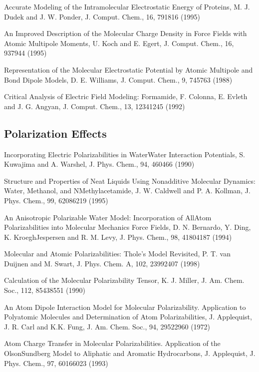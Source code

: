 \documentclass[letterpaper,11pt,english]{sphinxmanual}
\begin{document}
Accurate Modeling of the Intramolecular Electrostatic Energy of Proteins, M. J. Dudek and J. W. Ponder, J. Comput. Chem., 16, 791\sphinxhyphen{}816 (1995)

An Improved Description of the Molecular Charge Density in Force Fields with Atomic Multipole Moments, U. Koch and E. Egert, J. Comput. Chem., 16, 937\sphinxhyphen{}944 (1995)

Representation of the Molecular Electrostatic Potential by Atomic Multipole and Bond Dipole Models, D. E. Williams, J. Comput. Chem., 9, 745\sphinxhyphen{}763 (1988)

Critical Analysis of Electric Field Modeling: Formamide, F. Colonna, E. Evleth and J. G. Angyan, J. Comput. Chem., 13, 1234\sphinxhyphen{}1245 (1992)


\subsection{Polarization Effects}
\label{\detokenize{text/references:polarization-effects}}
Incorporating Electric Polarizabilities in Water\sphinxhyphen{}Water Interaction Potentials, S. Kuwajima and A. Warshel, J. Phys. Chem., 94, 460\sphinxhyphen{}466 (1990)

Structure and Properties of Neat Liquids Using Nonadditive Molecular Dynamics: Water, Methanol, and N\sphinxhyphen{}Methylacetamide, J. W. Caldwell and P. A. Kollman, J. Phys. Chem., 99, 6208\sphinxhyphen{}6219 (1995)

An Anisotropic Polarizable Water Model: Incorporation of All\sphinxhyphen{}Atom Polarizabilities into Molecular Mechanics Force Fields, D. N. Bernardo, Y. Ding, K. Kroegh\sphinxhyphen{}Jespersen and R. M. Levy, J. Phys. Chem., 98, 4180\sphinxhyphen{}4187 (1994)

Molecular and Atomic Polarizabilities: Thole’s Model Revisited, P. T. van Duijnen and M. Swart, J. Phys. Chem. A, 102, 2399\sphinxhyphen{}2407 (1998)

Calculation of the Molecular Polarizability Tensor, K. J. Miller, J. Am. Chem. Soc., 112, 8543\sphinxhyphen{}8551 (1990)

An Atom Dipole Interaction Model for Molecular Polarizability. Application to Polyatomic Molecules and Determination of Atom Polarizabilities, J. Applequist, J. R. Carl and K.\sphinxhyphen{}K. Fung, J. Am. Chem. Soc., 94, 2952\sphinxhyphen{}2960 (1972)

Atom Charge Transfer in Molecular Polarizabilities. Application of the Olson\sphinxhyphen{}Sundberg Model to Aliphatic and Aromatic Hydrocarbons, J. Applequist, J. Phys. Chem., 97, 6016\sphinxhyphen{}6023 (1993)
\end{document}
